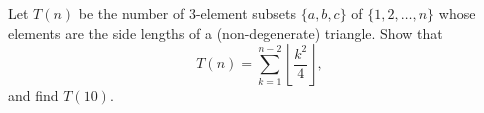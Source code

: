 Let $T(n)$ be the number of $3$-element subsets $\{a,b,c\}$ of $\{1,2,\dots,n\}$ whose elements are the side lengths of a (non-degenerate) triangle. Show that
\[
T(n)=\sum_{k=1}^{n-2}\left\lfloor\dfrac{k^2}{4}\right\rfloor,
\]
and find $T(10)$.
